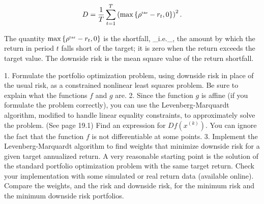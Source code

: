 \[D=\frac{1}{T}\sum_{t=1}^{T}\left(\max\left\{\rho^{\mbox{\tiny tar}}-r_{t},0 \right\}\right)^{2}.\]

The quantity \(\max\left\{\rho^{\mbox{\tiny tar}}-r_{t},0\right\}\) is the shortfall, _i.e._, the amount by which the return in period \(t\) falls short of the target; it is zero when the return exceeds the target value. The downside risk is the mean square value of the return shortfall.

1. Formulate the portfolio optimization problem, using downside risk in place of the usual risk, as a constrained nonlinear least squares problem. Be sure to explain what the functions \(f\) and \(g\) are.
2. Since the function \(g\) is affine (if you formulate the problem correctly), you can use the Levenberg-Marquardt algorithm, modified to handle linear equality constraints, to approximately solve the problem. (See page 19.1) Find an expression for \(Df(x^{(k)})\). You can ignore the fact that the function \(f\) is not differentiable at some points.
3. Implement the Levenberg-Marquardt algorithm to find weights that minimize downside risk for a given target annualized return. A very reasonable starting point is the solution of the standard portfolio optimization problem with the same target return. Check your implementation with some simulated or real return data (available online). Compare the weights, and the risk and downside risk, for the minimum risk and the minimum downside risk portfolios.

